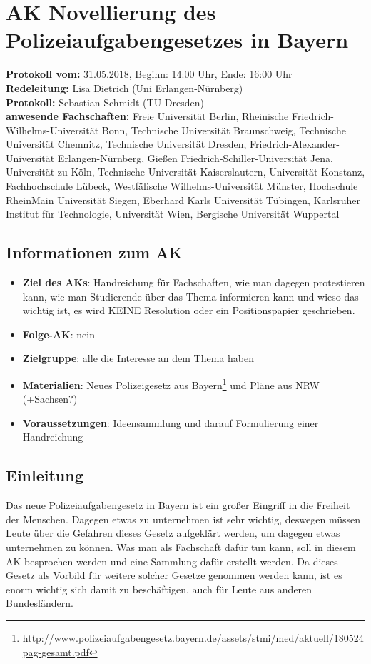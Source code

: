 
\section{AK Novellierung des Polizeiaufgabengesetzes in Bayern}

  \textbf{Protokoll vom:} 31.05.2018, %
  Beginn: 14:00 Uhr, %
  Ende: 16:00 Uhr \\ %
  \textbf{Redeleitung:} Lisa Dietrich (Uni Erlangen-Nürnberg) \\
  \textbf{Protokoll:} Sebastian Schmidt (TU Dresden) \\
  \textbf{anwesende Fachschaften:} Freie Universität Berlin, Rheinische Friedrich-Wilhelms-Universität Bonn, Technische Universität Braunschweig, Technische Universität Chemnitz, Technische Universität Dresden, Friedrich-Alexander-Universität Erlangen-Nürnberg, Gießen Friedrich-Schiller-Universität Jena, Universität zu Köln, Technische Universität Kaiserslautern, Universität Konstanz, Fachhochschule Lübeck, Westfälische Wilhelms-Universität Münster, Hochschule RheinMain Universität Siegen, Eberhard Karls Universität Tübingen, Karlsruher Institut für Technologie, Universität Wien, Bergische Universität Wuppertal

  \subsection*{Informationen zum AK}
    \begin{itemize}
      \item \textbf{Ziel des AKs}: Handreichung für Fachschaften, wie man dagegen protestieren kann, wie man Studierende über das Thema informieren kann und wieso das wichtig ist, es wird KEINE Resolution oder ein Positionspapier geschrieben.
      \item \textbf{Folge-AK}: nein
      \item \textbf{Zielgruppe}:  alle die Interesse an dem Thema haben
      \item \textbf{Materialien}: Neues Polizeigesetz aus Bayern\footnote{\url{http://www.polizeiaufgabengesetz.bayern.de/assets/stmi/med/aktuell/180524pag-gesamt.pdf}} und Pläne aus NRW (+Sachsen?) 
      \item \textbf{Voraussetzungen}: Ideensammlung und darauf Formulierung einer Handreichung
    \end{itemize}

  \subsection*{Einleitung}
    Das neue Polizeiaufgabengesetz in Bayern ist ein großer Eingriff in die Freiheit der Menschen. Dagegen etwas zu unternehmen ist sehr wichtig, deswegen müssen Leute über die Gefahren dieses Gesetz aufgeklärt werden, um dagegen etwas unternehmen zu können. Was man als Fachschaft dafür tun kann, soll in diesem AK besprochen werden und eine Sammlung dafür erstellt werden. Da dieses Gesetz als Vorbild für weitere solcher Gesetze genommen werden kann, ist es enorm wichtig sich damit zu beschäftigen, auch für Leute aus anderen Bundesländern.

